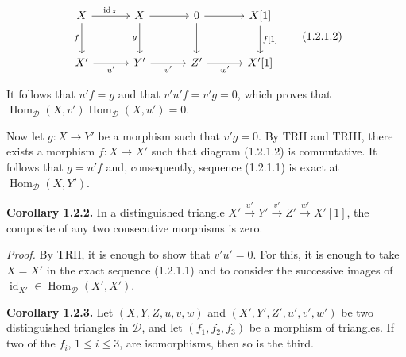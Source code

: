 \begin{equation}
  \begin{tikzcd}[column sep=3.2em,row sep=2.5em]
    X \arrow[r,"{\operatorname{id}_X}"] \arrow[d,"f"']
      & X \arrow[r] \arrow[d,"g"']
      & 0 \arrow[r] \arrow[d]
      & X[1] \arrow[d,"{f[1]}"] \\
    X' \arrow[r,"u'"']
      & Y' \arrow[r,"v'"']
      & Z' \arrow[r,"w'"']
      & X'[1]
  \end{tikzcd}
  \tag{1.2.1.2}
\end{equation}

It follows that $u'f=g$ and that $v'u'f=v'g=0$, which proves that
$\operatorname{Hom}_{\mathcal D}(X,v')
\operatorname{Hom}_{\mathcal D}(X,u')=0$.

Now let $g\colon X\longrightarrow Y'$ be a morphism such that $v'g=0$.
By TRII and TRIII, there exists a morphism $f\colon X\longrightarrow X'$
such that diagram (1.2.1.2) is commutative. It follows that $g=u'f$ and,
consequently, sequence (1.2.1.1) is exact at
$\operatorname{Hom}_{\mathcal D}(X,Y')$.

\medskip
\noindent\textbf{Corollary 1.2.2.}\quad
In a distinguished triangle
$X'\xrightarrow{u'}Y'\xrightarrow{v'}Z'\xrightarrow{w'}X'[1]$, the
composite of any two consecutive morphisms is zero.

\noindent\emph{Proof.}\quad
By TRII, it is enough to show that $v'u'=0$. For this, it is enough to take
$X=X'$ in the exact sequence (1.2.1.1) and to consider the successive
images of $\operatorname{id}_{X'}\in\operatorname{Hom}_{\mathcal D}(X',X')$.

\medskip
\noindent\textbf{Corollary 1.2.3.}\quad
Let $(X,Y,Z,u,v,w)$ and $(X',Y',Z',u',v',w')$ be two distinguished
triangles in $\mathcal D$, and let $(f_1,f_2,f_3)$ be a morphism of
triangles. If two of the $f_i$, $1\leq i\leq3$, are isomorphisms, then so
is the third.
\endgroup

